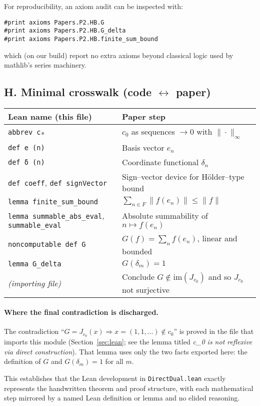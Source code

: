 \documentclass[11pt]{article}
\begin{document}
For reproducibility, an axiom audit can be inspected with:
\begin{lstlisting}[language={},numbers=none]
#print axioms Papers.P2.HB.G
#print axioms Papers.P2.HB.G_delta
#print axioms Papers.P2.HB.finite_sum_bound
\end{lstlisting}
which (on our build) report no extra axioms beyond classical logic used by mathlib's series machinery.

\subsection*{H. Minimal crosswalk (code $\leftrightarrow$ paper)}

\begin{center}
\begin{tabular}{@{}p{} p{}@{}}
\toprule
\textbf{Lean name (this file)} & \textbf{Paper step} \\
\midrule
\verb|abbrev c₀| & $c_0$ as sequences $\to 0$ with $\|\cdot\|_\infty$ \\
\verb|def e (n)| & Basis vector $e_n$ \\
\verb|def δ (n)| & Coordinate functional $\delta_n$ \\
\verb|def coeff|, \verb|def signVector| & Sign--vector device for Hölder--type bound \\
\verb|lemma finite_sum_bound| & $\sum_{n\in F}\|f(e_n)\|\le \|f\|$ \\
\verb|lemma summable_abs_eval|, \verb|summable_eval| & Absolute summability of $n\mapsto f(e_n)$ \\
\verb|noncomputable def G| & $G(f)=\sum_n f(e_n)$, linear and bounded \\
\verb|lemma G_delta| & $G(\delta_m)=1$ \\
\textit{(importing file)} & Conclude $G\notin \mathrm{im}(J_{c_0})$ and so $J_{c_0}$ not surjective \\
\bottomrule
\end{tabular}
\end{center}

\paragraph{Where the final contradiction is discharged.}
The contradiction ``$G=J_{c_0}(x)\Rightarrow x=(1,1,\dots)\notin c_0$'' is proved in the file that imports this module (Section~\ref{sec:lean}; see the lemma titled \emph{c_0 is not reflexive via direct construction}). That lemma uses only the two facts exported here: the definition of $G$ and $G(\delta_m)=1$ for all $m$.

\medskip
This establishes that the Lean development in \texttt{DirectDual.lean} exactly represents the handwritten theorem and proof structure, with each mathematical step mirrored by a named Lean definition or lemma and no elided reasoning.
\end{document}
